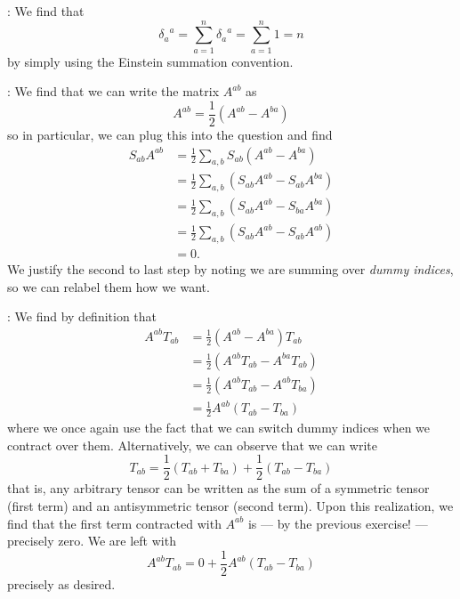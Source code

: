 
:
 We find that \begin {equation}{\delta _{a}}^{a} = \sum _{a=1}^{n}{\delta _{a}}^{a}=\sum ^{n}_{a=1}1=n\end {equation} by simply using the Einstein summation convention.

:
 We find that we can write the matrix $A^{ab}$ as \begin {equation} A^{ab} = \frac {1}{2}(A^{ab}-A^{ba}) \end {equation} so in particular, we can plug this into the question and find \begin {subequations} \begin {align} S_{ab}A^{ab} &= \frac {1}{2}\sum _{a,b}S_{ab}(A^{ab}-A^{ba})\\ &= \frac {1}{2}\sum _{a,b}(S_{ab}A^{ab}-S_{ab}A^{ba})\\ &=\frac {1}{2}\sum _{a,b}(S_{ab}A^{ab}-S_{ba}A^{ba})\\ &=\frac {1}{2}\sum _{a,b}(S_{ab}A^{ab}-S_{ab}A^{ab})\\ &= 0. \end {align} \end {subequations} We justify the second to last step by noting we are summing over \emph {dummy indices}, so we can relabel them how we want.

:
 We find by definition that \begin {subequations} \begin {align} A^{ab}T_{ab} &= \frac {1}{2}(A^{ab}-A^{ba})T_{ab}\\ &=\frac {1}{2}(A^{ab}T_{ab}-A^{ba}T_{ab})\\ &=\frac {1}{2}(A^{ab}T_{ab}-A^{ab}T_{ba})\\ &=\frac {1}{2}A^{ab}(T_{ab}-T_{ba}) \end {align} \end {subequations} where we once again use the fact that we can switch dummy indices when we contract over them. Alternatively, we can observe that we can write \begin {equation}T_{ab} = \frac {1}{2}(T_{ab}+T_{ba})+\frac {1}{2}(T_{ab}-T_{ba}) \end {equation} that is, any arbitrary tensor can be written as the sum of a symmetric tensor (first term) and an antisymmetric tensor (second term). Upon this realization, we find that the first term contracted with $A^{ab}$ is --- by the previous exercise! --- precisely zero. We are left with \begin {equation}A^{ab}T_{ab} = 0 + \frac {1}{2}A^{ab}(T_{ab}-T_{ba}) \end {equation} precisely as desired.

